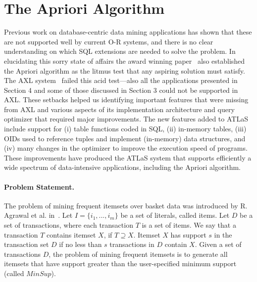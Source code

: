 
\section{The Apriori Algorithm \inv}

Previous work on database-centric data mining applications has shown
that these are not supported well by current O-R systems, and there is
no clear understanding on which SQL extensions are needed to solve the
problem. In elucidating this sorry state of affairs the award winning
paper~\cite{cachemine} also established the Apriori algorithm as the
litmus test that any aspiring solution must satisfy.  The AXL
system~\cite{vldb2k} failed this acid test---also all the applications
presented in Section 4 and some of those discussed in Section 3 could
not be supported in AXL. These setbacks helped us identifying
important features that were missing from AXL and various aspects of
its implementation architecture and query optimizer that required
major improvements.  The new features added to ATLaS include support
for (i) table functions coded in SQL, (ii) in-memory tables, (iii)
OIDs used to reference tuples and implement (in-memory) data
structures, and (iv) many changes in the optimizer to improve the
execution speed of programs.
These improvements have produced the ATLaS system that supports
efficiently a wide spectrum of data-intensive applications, including
the Apriori algorithm.


\paragraph{Problem Statement.} The problem of mining frequent itemsets over
basket data was introduced by R. Agrawal et al. in~\cite{agg94}.
Let $I=\{i_1, ..., i_m\}$ be a set of literals, called items. Let $D$
be a set of transactions, where each transaction $T$ is a set of
items.  We say that a transaction $T$ contains itemset $X$, if
$T\supseteq X$. Itemset $X$ has support $s$ in the transaction set $D$
if no less than $s$ transactions in $D$ contain $X$.
Given a set of transactions $D$, the problem of mining frequent
itemsets is to generate all itemsets that have support greater than
the user-specified minimum support (called $MinSup$).

